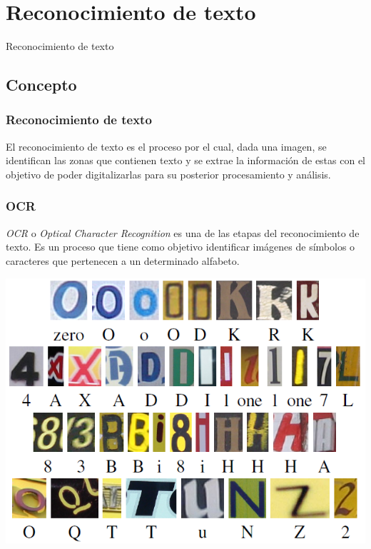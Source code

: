 \section{Reconocimiento de texto}
	\begin{frame}
		\begin{center}
			\begin{huge}
				{Reconocimiento de texto}
			\end{huge}
		\end{center}
	\end{frame}
	\subsection{Concepto}
		\begin{frame}
			\frametitle{Reconocimiento de texto}
			\begin{definition}
				El reconocimiento de texto es el proceso por el cual, dada una imagen, se identifican las zonas que contienen texto y se extrae la información de estas con el objetivo de poder digitalizarlas para su posterior procesamiento y análisis.
			\end{definition}
		\end{frame}
		\begin{frame}
			\frametitle{OCR}	
			\begin{definition}
				\textit{OCR} o \textit{Optical Character Recognition} es una de las etapas del reconocimiento de texto. Es un proceso que tiene como objetivo identificar imágenes de símbolos o caracteres que pertenecen a un determinado alfabeto.
			\end{definition}
			\begin{center}
				\includegraphics[height=0.45\paperheight]{../img/hog/confusing_english.png}
			\end{center}
		\end{frame}
